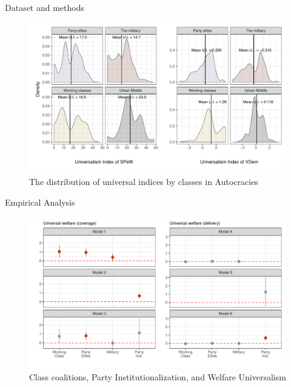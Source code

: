 \documentclass{Bredelebeamer}
\begin{document}
\begin{frame}{Dataset and methods}
\begin{figure}[!htbt]
	\centering
	\includegraphics[width=1\linewidth]{"../3. Datasets_Codebooks/Figures/Plot2"}
	\caption{The distribution of universal indices by classes in Autocracies}
	\label{fig:plot3}
\end{figure}
\end{frame}

\begin{frame}{Empirical Analysis}
\begin{figure}[!htbt]
	\centering
	\includegraphics[width=1\linewidth]{"../3. Datasets_Codebooks/Figures/Table1"}
	\caption{Class coalitions, Party Institutionalization, and Welfare Universalism}
	\label{fig:plot4}
\end{figure}
\end{frame}

\end{document}
